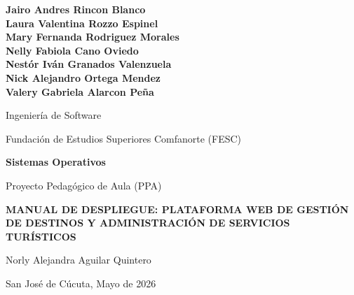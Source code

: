 \documentclass[12pt,letterpaper]{article}
\begin{document}
\begin{titlepage}
\centering
\vspace*{0.5in}

    {\normalsize\bfseries
    Jairo Andres Rincon Blanco \\
    Laura Valentina Rozzo Espinel\\
    Mary Fernanda Rodriguez Morales\\
    Nelly Fabiola Cano Oviedo\\
    Nestór Iván Granados Valenzuela\\
    Nick Alejandro Ortega Mendez\\
    Valery Gabriela Alarcon Peña\\
    \par}
    \vspace{0.6in}

{\normalsize Ingeniería de Software \par}
\vspace{0.4in}

{\normalsize Fundación de Estudios Superiores Comfanorte (FESC) \par}
\vspace{0.6in}

{\normalsize\bfseries Sistemas Operativos \par}
\vspace{0.4in}

{\normalsize Proyecto Pedagógico de Aula (PPA) \par}
\vspace{0.5in}

{\normalsize\bfseries
MANUAL DE DESPLIEGUE: PLATAFORMA WEB DE GESTIÓN DE DESTINOS Y ADMINISTRACIÓN DE SERVICIOS TURÍSTICOS
\par}

\vspace{0.6in}

{\normalsize Norly Alejandra Aguilar Quintero \par}

\vfill

{\normalsize San José de Cúcuta, Mayo de 2026 \par}

\end{titlepage}
\end{document}
